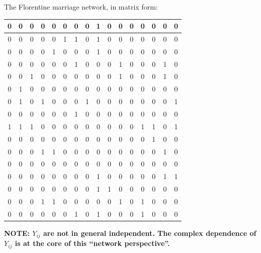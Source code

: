 \documentclass[slidestop,compress, 10pt]{beamer}
\begin{document}
{The Florentine marriage network, in matrix form:
{\tiny
\begin{table}[htdp]
\begin{center}\begin{tabular}{|c|c|c|c|c|c|c|c|c|c|c|c|c|c|c|c|}
\hline 
0 & 0 & 0 & 0 &  0 &  0 &0 &0 & 1&0 &      0 &      0 &      0 & 0 &      0 &      0 \\ \hline
0 & 0 &  0 & 0 &     0 &1&     1&     0 &     1&      0 &      0 &      0 & 0 &0 &0 &0 \\  \hline
0 & 0 & 0 &0 & 1&     0 &     0 &     0 &     1&      0 &      0 &      0 & 0 &0 &0 &0 \\  \hline
0 & 0 & 0 &0 & 0 &     0 &     1&     0 &     0 &      0 &      1&      0 & 0 & 0 &1&0 \\  \hline
0 & 0 & 1& 0 & 0 &     0 &     0 &     0 &     0 &      0 &      1&      0 & 0 & 0 &1&0 \\  \hline
0 & 1&  0 &0 & 0 &     0 &     0 &     0 &     0 &      0 &      0 &      0 & 0 & 0 &0 &0 \\   \hline
0 & 1&0 & 1&0 & 0 &     0 &     1&     0 &      0 &      0 &      0 &  0 &      0 & 0 &1 \\  \hline
0 & 0 &0 & 0 & 0 &     0 &     1&     0 &     0 &      0 &      0 &      0 & 0 & 0 &0 &0 \\  \hline
1& 1& 1&0 &0 & 0 &     0 &     0 &     0 &      0 &      0 &      0 &  1& 1&0 &      1\\  \hline
0 & 0 &0 &0 & 0 &     0 &     0 &     0 &     0 &      0 &      0 & 0 & 0 &1&      0 &      0 \\  \hline
0 &0 &0 &1&1&  0 &     0 &     0 &     0 &      0 &      0 &0 &    0 &      0 &      1&      0 \\  \hline
0 & 0 & 0 &0 &0 &0 & 0 &     0 &     0 &      0 &      0 &      0 & 0 &      0 &      0 &      0 \\  \hline
0 & 0 &0 & 0 &0 &0 &0 & 0 &     1&      0 &      0 &      0 & 0 &      0 &      1&      1\\  \hline
0 & 0 & 0 & 0 & 0 & 0 & 0 &     0 &     1&      1&      0 &      0 & 0 &      0 &      0 &      0 \\   \hline
0 & 0 &0 & 1& 1& 0 & 0 &     0 &     0 &      0 &      1&      0 &   1&      0 &      0 &      0 \\  \hline
0 & 0 &0 & 0 & 0 & 0 &     1&     0 &     1&      0 &      0 &      0 & 1&      0 &      0 &      0\\ 
\hline \end{tabular} 
\end{center}
\label{defaulttable}
\end{table}
}
\textbf{NOTE: $Y_{ij}$ are not in general independent.  The complex dependence of $Y_{ij}$ is at the core of this ``network perspective''.}
}
\end{document}
